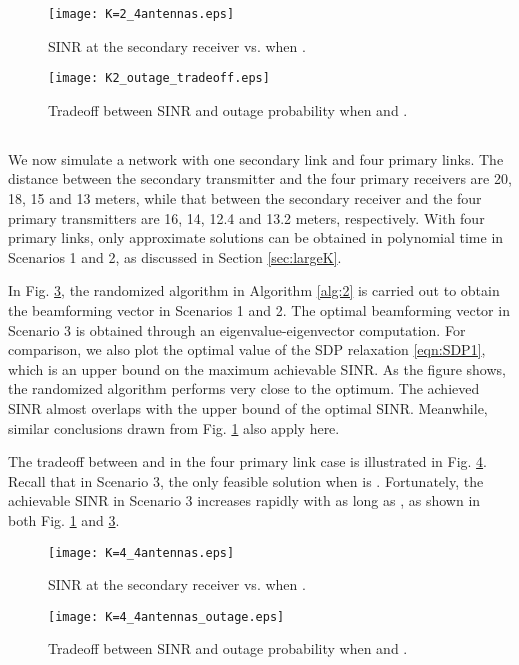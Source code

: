 \documentclass[twocolumn,10pt]{IEEEtran}
\theoremstyle{plain} \newtheorem{theorem}{Theorem}
\theoremstyle{plain} \newtheorem{proposition}{Proposition}
\theoremstyle{plain} \newtheorem{corollary}{Corollary}
\theoremstyle{remark} \newtheorem{remark}{Remark}
\theoremstyle{remark} \newtheorem{lemma}{Lemma}
\theoremstyle{plain} \newtheorem{definition}{Definition}
\theoremstyle{plain} \newtheorem{assumption}{Assumption}
\theoremstyle{plain} \newtheorem{fact}{Fact}
\begin{document}
\begin{figure}[!ht]
\centering
\texttt{[image: K=2\_4antennas.eps]}
\caption{SINR at the secondary receiver vs.  when .}\label{fig:K2SINR}
\end{figure}

\begin{figure}[!ht]
\centering
\texttt{[image: K2\_outage\_tradeoff.eps]}
\caption{Tradeoff between SINR and outage probability  when  and .}\label{fig:K2outage}
\end{figure}

\subsection{}
We now simulate a network with one secondary link and four primary links. The distance between the secondary transmitter and the four primary receivers are 20, 18, 15 and 13 meters, while that between the secondary receiver and the four primary transmitters are 16, 14, 12.4 and 13.2 meters, respectively. With four primary links, only approximate solutions can be obtained in polynomial time in Scenarios 1 and 2, as discussed in Section \ref{sec:largeK}.

In Fig. \ref{fig:K4SINR}, the randomized algorithm in Algorithm \ref{alg:2} is carried out to obtain the beamforming vector in Scenarios 1 and 2. The optimal beamforming vector in Scenario 3 is obtained through an eigenvalue-eigenvector computation. For comparison, we also plot the optimal value of the SDP relaxation \eqref{eqn:SDP1}, which is an upper bound on the maximum achievable SINR. As the figure shows, the randomized algorithm performs very close to the optimum. The achieved SINR almost overlaps with the upper bound of the optimal SINR. Meanwhile, similar conclusions drawn from Fig. \ref{fig:K2SINR} also apply here.

The tradeoff between  and  in the four primary link case is illustrated in Fig. \ref{fig:K4outage}. Recall that in Scenario 3, the only feasible solution when  is . Fortunately, the achievable SINR in Scenario 3 increases rapidly with  as long as , as shown in both Fig. \ref{fig:K2SINR} and \ref{fig:K4SINR}.

\begin{figure}[!ht]
\centering
\texttt{[image: K=4\_4antennas.eps]}
\caption{SINR at the secondary receiver vs.  when .}\label{fig:K4SINR}
\end{figure}

\begin{figure}[!ht]
\centering
\texttt{[image: K=4\_4antennas\_outage.eps]}
\caption{Tradeoff between SINR and outage probability  when  and .}\label{fig:K4outage}
\end{figure}
\end{document}
